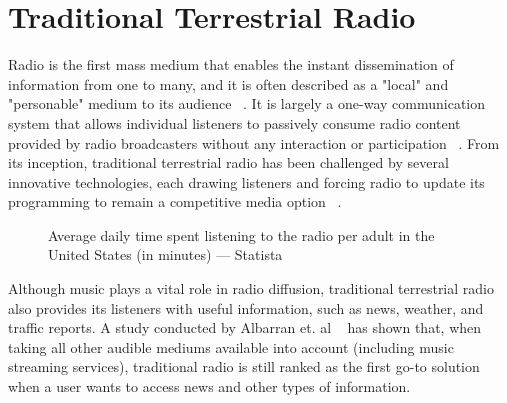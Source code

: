 


\section{Traditional Terrestrial Radio}
\label{chap:ttr}
Radio is the first mass medium that enables the instant dissemination of information from one to many, and it is often described as a "local" and "personable" medium to its audience ~\cite{Ren2004}. It is largely a one-way communication system that allows individual listeners to passively consume radio content provided by radio broadcasters without any interaction or participation ~\cite{Gazi2011}. From its inception, traditional terrestrial radio has been challenged by several innovative technologies, each drawing listeners and forcing radio to update its programming to remain a competitive media option ~\cite{Albarran2007}. 

\begin{figure}
 \centering
\caption{Average daily time spent listening to the radio per adult in the United States (in minutes) —  Statista}
\label{fig:test_env}
\end{figure}


Although music plays a vital role in radio diffusion, traditional terrestrial radio also provides its listeners with useful information, such as news, weather, and traffic reports. A study conducted by Albarran et. al ~\cite{Albarran2007} has shown that, when taking all other audible mediums available into account (including music streaming services), traditional radio is still ranked as the first go-to solution when a user wants to access news and other types of information. 


